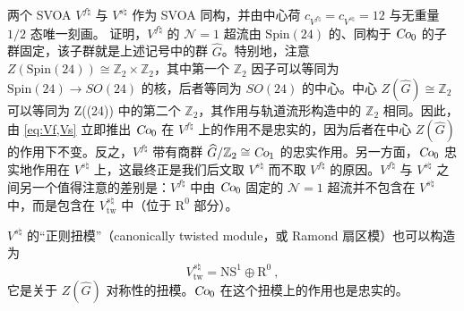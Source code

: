 \documentclass[11pt,a4paper,fontset=windows]{ctexart}
\numberwithin{equation}{section}
\newcommand{\Co}{\operatorname{\textsl{Co}}}      %
\newcommand{\ZZ}{\mathbb{Z}}
\begin{document}
两个 SVOA $V^{f\natural}$ 与 $V^{s\natural}$ 作为 SVOA 同构，并由中心荷 $c_{V^{f\natural}}=c_{V^{s\natural}}=12$ 与无重量 $1/2$ 态唯一刻画。\cite{DuncanJohnF.2007SfCl} 证明，$V^{f\natural}$ 的 $\mathcal{N}=1$ 超流由 $\text{Spin}(24)$ 的、同构于 $\Co_0$ 的子群固定，该子群就是上述记号中的群 $\widehat{G}$。特别地，注意 $Z(\text{Spin}(24))\cong\ZZ_2\times\ZZ_2$，其中第一个 $\ZZ_2$ 因子可以等同为 $\text{Spin}(24) \to SO(24)$ 的核，后者等同为 $SO(24)$ 的中心。中心 $Z(\widehat{G})\cong\ZZ_2$ 可以等同为 Z((24)) 中的第二个 $\ZZ_2$，其作用与轨道流形构造中的 $\ZZ_2$ 相同。因此，由 \eqref{eq:Vf,Vs} 立即推出 $\Co_0$ 在 $V^{f\natural}$ 上的作用不是忠实的，因为后者在中心 $Z(\widehat{G})$ 的作用下不变。反之，$V^{f\natural}$ 带有商群 $\widehat{G}/\ZZ_2\cong\Co_1$ 的忠实作用。另一方面，$\Co_0$ 忠实地作用在 $V^{s\natural}$ 上，这最终正是我们后文取 $V^{s\natural}$ 而不取 $V^{f\natural}$ 的原因。$V^{f\natural}$ 与 $V^{s\natural}$ 之间另一个值得注意的差别是：$V^{f\natural}$ 中由 $\Co_0$ 固定的 $\mathcal{N}=1$ 超流并不包含在 $V^{s\natural}$ 中，而是包含在 $V^{s\natural}_{\text{tw}}$ 中（位于 $\text{R}^0$ 部分）。


$V^{s\natural}$ 的“正则扭模”（canonically twisted module，或 Ramond 扇区模）也可以构造为
\begin{equation}
V^{s\natural}_{\text{tw}}=\text{NS}^1\oplus\text{R}^0~,
\end{equation}
它是关于 $Z(\widehat{G})$ 对称性的扭模。$\Co_0$ 在这个扭模上的作用也是忠实的。
\end{document}
